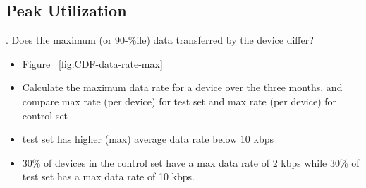 \subsection{Peak Utilization}
\label{subsec:peak-util}


. Does the maximum (or 90-\%ile) data transferred by the device differ?

\begin{itemize}
\itemsep0em 
\item Figure ~\ref{fig:CDF-data-rate-max}
\item Calculate the maximum data rate for a device over the three months, and compare max rate (per device) for test set and max rate (per device) for control set
\item test set has higher (max) average data rate below 10 kbps 
\item 30\% of devices in the control set have a max data rate of 2 kbps while 30\% of test set has a max data rate of 10 kbps.
\end{itemize}

